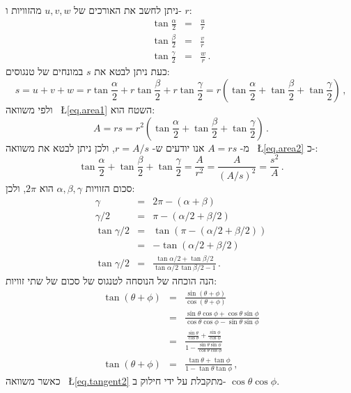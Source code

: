 \documentclass[12pt,a4paper]{article}
\begin{document}
\vspace*{-6ex}

ניתן לחשב את האורכים של 
$u,v,w$
מהזוויות ו-%
$r$:
\begin{eqnarray}
\tan \frac{\alpha}{2} &=& \frac{u}{r}\label{eq.alpha}\\
\tan \frac{\beta}{2} &=& \frac{v}{r}\label{eq.beta}\\
\tan \frac{\gamma}{2} &=& \frac{w}{r}\label{eq.gamma}\,.
\end{eqnarray}
כעת ניתן לבטא את
$s$
במונחים של טנגוסים:
\[
s = u+v+w = r\tan \frac{\alpha}{2}+r\tan \frac{\beta}{2}+r\tan \frac{\gamma}{2} = r\left(\tan \frac{\alpha}{2}+\tan \frac{\beta}{2}+\tan \frac{\gamma}{2}\right)\,,
\]
ולפי משוואה%
~\L{\ref{eq.area1}}
השטח הוא:
\begin{equation}
A = rs = r^2\left(\tan \frac{\alpha}{2}+\tan \frac{\beta}{2}+\tan \frac{\gamma}{2}\right)\,.\label{eq.area2}
\end{equation}
מ-%
$A=rs$
אנו יודעים ש-%
$r=A/s$,
ולכן ניתן לבטא את משוואה%
~\L{\ref{eq.area2}}
כ-:
\begin{equation}
\tan \frac{\alpha}{2}+\tan \frac{\beta}{2}+\tan \frac{\gamma}{2} = \frac{A}{r^2} = \frac{A}{(A/s)^2} = \frac{s^2}{A}\,.\label{eq.area3}
\end{equation}
סכום הזוויות
$\alpha,\beta,\gamma$
הוא
$2\pi$,
ולכן:
\begin{eqnarray}
\gamma &=& 2\pi - (\alpha + \beta)\\
\gamma/2 &=& \pi - (\alpha/2 + \beta/2)\\
\tan\gamma/2 &=& \tan(\pi - (\alpha/2 + \beta/2))\\
&=& -\tan (\alpha/2 + \beta/2)\\
\tan\gamma/2 &=& \frac{\tan\alpha/2 + \tan\beta/2}{\tan\alpha/2 \, \tan\beta/2-1}\,.\label{eq.tangent1}
\end{eqnarray}
הנה הוכחה של הנוסחה לטנגוס של סכום של שתי זוויות:
\begin{eqnarray}
\tan (\theta+\phi) &=& \frac{\sin(\theta+\phi)}{\cos(\theta+\phi)}\\
&=&\frac{\sin\theta\cos\phi+\cos\theta\sin\phi}{\cos\theta\cos\phi-\sin\theta\sin\phi}\\
&=&\frac{\displaystyle\frac{\sin\theta}{\cos\theta}+\frac{\sin\phi}{\cos\phi}}{\displaystyle 1-\frac{\sin\theta\sin\phi}{\cos\theta\cos\phi}}\label{eq.tangent2}\\
\tan (\theta+\phi) &=&\frac{\tan\theta + \tan \phi}{1-\tan\theta\tan\phi}\,,\label{eq.tangent3}
\end{eqnarray}
כאשר משוואה%
~\L{\ref{eq.tangent2}}
מתקבלת על ידי חילוק ב-%
$\cos\theta\cos\phi$.
\end{document}
